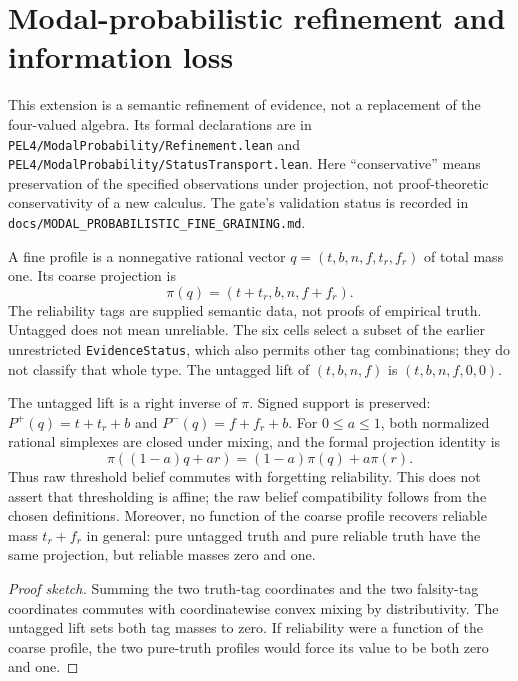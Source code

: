 \section{Modal-probabilistic refinement and information loss}
\label{sec:mpfg}

This extension is a semantic refinement of evidence, not a replacement of the
four-valued algebra. Its formal declarations are in
\texttt{PEL4/ModalProbability/Refinement.lean} and
\texttt{PEL4/ModalProbability/StatusTransport.lean}.
Here ``conservative'' means preservation of the specified observations under projection, not proof-theoretic conservativity of a new calculus. The gate's validation status is recorded in
\texttt{docs/MODAL\_PROBABILISTIC\_FINE\_GRAINING.md}.

\begin{definition}
A fine profile is a nonnegative rational vector
\(q=(t,b,n,f,t_r,f_r)\) of total mass one. Its coarse projection is
\[
  \pi(q)=(t+t_r,b,n,f+f_r).
\]
The reliability tags are supplied semantic data, not proofs of empirical
truth. Untagged does not mean unreliable. The six cells select a subset of the earlier unrestricted \texttt{EvidenceStatus}, which also permits other tag combinations; they do not classify that whole type. The untagged lift of \((t,b,n,f)\) is \((t,b,n,f,0,0)\).
\end{definition}

\begin{proposition}
The untagged lift is a right inverse of \(\pi\). Signed support is preserved:
\(P^+(q)=t+t_r+b\) and \(P^-(q)=f+f_r+b\).
For \(0\le a\le1\), both normalized rational simplexes are closed under mixing,
and the formal projection identity is
\[
 \pi((1-a)q+ar)=(1-a)\pi(q)+a\pi(r).
\]
Thus raw threshold belief commutes with forgetting reliability. This does not
assert that thresholding is affine; the raw belief compatibility follows from
the chosen definitions. Moreover, no function of the coarse profile recovers
reliable mass \(t_r+f_r\) in general: pure untagged truth and pure reliable truth
have the same projection, but reliable masses zero and one.
\statusverified
\end{proposition}
\begin{proof}[Proof sketch]
Summing the two truth-tag coordinates and the two falsity-tag coordinates commutes with coordinatewise convex mixing by distributivity. The untagged lift sets both tag masses to zero. If reliability were a function of the coarse profile, the two pure-truth profiles would force its value to be both zero and one.
\end{proof}

